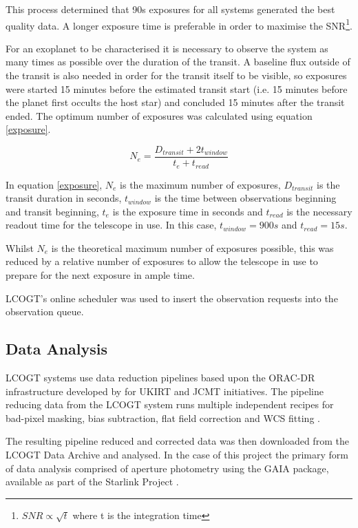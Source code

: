 \documentclass[twoside,4pt]{article}
\begin{document}
\begin{multicols}{2}
This process determined that 90s exposures for all systems generated the best quality
data. A longer exposure time is preferable in order to maximise the SNR\footnote{$SNR 
\propto \sqrt{t}$ where t is the integration time}. 

For an exoplanet to be characterised it is necessary to observe the system as many times as possible over the duration of the transit. A baseline flux outside of the transit is also needed in order for the transit itself to be visible, so exposures were started 15 minutes before the estimated transit start (i.e. 15 minutes before the planet first occults the host star) and concluded 15 minutes after the transit ended. The optimum number of exposures was calculated using equation \ref{exposure}. 

\begin{equation} \label{exposure}
    N_{e} = \frac{D_{transit} + 2t_{window}}{t_{e} + t_{read}}
\end{equation}

In equation \ref{exposure}, $N_{e}$ is the maximum number of exposures, $D_{transit}$ is the transit duration in seconds, $t_{window}$ is the time between observations beginning and transit beginning, $t_{e}$ is the exposure time in seconds and $t_{read}$ is the necessary readout time for the telescope in use. In this case, $t_{window}=900s$ and $t_{read}=15s$.

Whilst $N_{e}$ is the theoretical maximum number of exposures possible, this was reduced by a relative number of exposures to allow the telescope in use to prepare for the next exposure in ample time. 

LCOGT's online scheduler was used to insert the observation requests into the observation queue.

\subsection{Data Analysis}
LCOGT systems use data reduction pipelines based upon the ORAC-DR infrastructure developed by \textcite{orac-dr} for UKIRT and JCMT initiatives. The pipeline reducing data from the LCOGT system runs multiple independent recipes for bad-pixel masking, bias subtraction, flat field correction and WCS fitting \parencite{pipeline}.  

The resulting pipeline reduced and corrected data was then downloaded from the LCOGT Data Archive and analysed. In the case of this project the primary form of data analysis comprised of aperture photometry using the GAIA package, available as part of the Starlink Project \parencite{starlink}.


\end{multicols}
\end{document}
